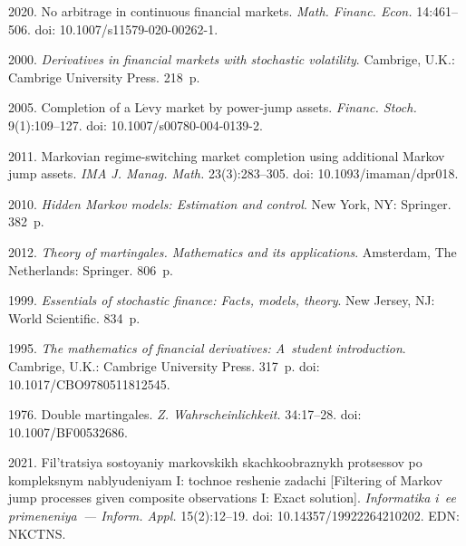 \begin{multicols}{2}
{{\begin{thebibliography}{99}
 2020. 
No arbitrage in continuous financial markets. \textit{Math. Financ. Econ.} 14:461--506. 
doi: 10.1007/s11579-020-00262-1.

 2000.
\textit{Derivatives in financial markets with stochastic volatility}. Cambrige, U.K.: Cambrige University Press. 218~p.

 2005.
Completion of a L$\acute{\mbox{e}}$vy market by power-jump assets. \textit{Financ. Stoch.} 9(1):109--127. doi: 10.1007/s00780-004-0139-2.

 2011.
Markovian regime-switching market completion using additional Markov jump assets.
\textit{IMA J. Manag. Math.} 23(3):283--305.
doi: 10.1093/imaman/dpr018.

 2010. \textit{Hidden Markov models: Estimation and control}. New York, NY: Springer. 382~p.

 2012.
\textit{Theory of martingales. Mathematics and its applications}. Amsterdam, The Netherlands: Springer. 806~p.

 1999. 
\textit{Essentials of stochastic finance: Facts, models, theory}. New Jersey, NJ: World Scientific. 834~p.

 1995.
\textit{The mathematics of financial derivatives: A~student introduction}.
Cambrige, U.K.: Cambrige University Press. 317~p. doi: 10.1017/CBO9780511812545.

 1976.
Double martingales. \textit{Z. Wahrscheinlichkeit.} 34:17--28.
doi: 10.1007/BF00532686.

 2021. Fil'tratsiya sostoyaniy markovskikh skachkoobraznykh protsessov po kompleksnym nablyudeniyam I: 
tochnoe reshenie zadachi [Filtering of Markov jump processes given composite observations I: Exact solution]. 
\textit{Informatika i~ee primeneniya~--- Inform. Appl.} 15(2):12--19. doi: 10.14357/19922264210202. EDN: NKCTNS.


\end{thebibliography}

 }
 }

\end{multicols}

